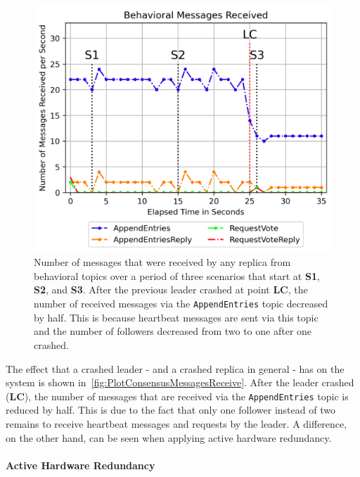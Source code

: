 \begin{figure}[!hb]
	\centering
	\includegraphics[width=0.8\linewidth]{images/plots/ConsensusMessagesReceive}
	\caption{Number of messages that were received by any replica from behavioral topics over a period of three scenarios that start at \textbf{S1}, \textbf{S2}, and \textbf{S3}. After the previous leader crashed at point \textbf{LC}, the number of received messages via the \texttt{AppendEntries} topic decreased by half. This is because heartbeat messages are sent via this topic and the number of followers decreased from two to one after one crashed.}
	\label{fig:PlotConsensusMessagesReceive}
\end{figure}

The effect that a crashed leader - and a crashed replica in general - has on the system is shown in~\autoref{fig:PlotConsensusMessagesReceive}.
After the leader crashed (\textbf{LC}), the number of messages that are received via the \texttt{AppendEntries} topic is reduced by half.
This is due to the fact that only one follower instead of two remains to receive heartbeat messages and requests by the leader.
A difference, on the other hand, can be seen when applying active hardware redundancy.


\paragraph{Active Hardware Redundancy}

